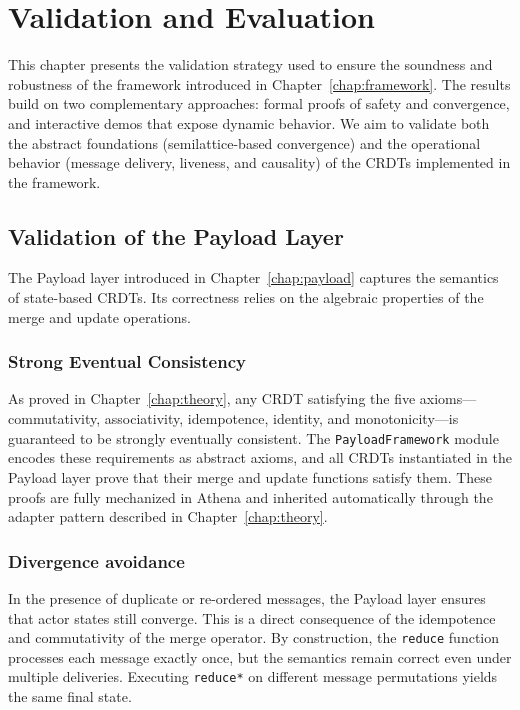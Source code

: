 

\chapter{Validation and Evaluation}\label{chap:validation}

This chapter presents the validation strategy used to ensure the soundness and robustness of the framework introduced in Chapter~\ref{chap:framework}. The results build on two complementary approaches: formal proofs of safety and convergence, and interactive demos that expose dynamic behavior. We aim to validate both the abstract foundations (semilattice-based convergence) and the operational behavior (message delivery, liveness, and causality) of the CRDTs implemented in the framework.

\section{Validation of the Payload Layer}

The Payload layer introduced in Chapter~\ref{chap:payload} captures the semantics of state-based CRDTs. Its correctness relies on the algebraic properties of the merge and update operations.

\subsection{Strong Eventual Consistency}

As proved in Chapter~\ref{chap:theory}, any CRDT satisfying the five axioms---commutativity, associativity, idempotence, identity, and monotonicity---is guaranteed to be strongly eventually consistent. The \texttt{PayloadFramework} module encodes these requirements as abstract axioms, and all CRDTs instantiated in the Payload layer prove that their merge and update functions satisfy them. These proofs are fully mechanized in Athena and inherited automatically through the adapter pattern described in Chapter~\ref{chap:theory}.

\subsection{Divergence avoidance}

In the presence of duplicate or re-ordered messages, the Payload layer ensures that actor states still converge. This is a direct consequence of the idempotence and commutativity of the merge operator. By construction, the \texttt{reduce} function processes each message exactly once, but the semantics remain correct even under multiple deliveries. Executing \texttt{reduce*} on different message permutations yields the same final state.

